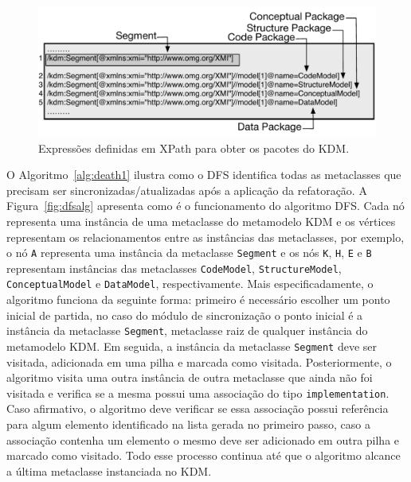 \begin{figure}[h]
	\centering
	\caption{Expressões definidas em XPath para obter os pacotes do KDM.}
	\label{fig:xpath_queries}
	\includegraphics[scale=0.68]{images/queiresANDATLSBESNew}
	\fautor
\end{figure}

O Algoritmo~\ref{alg:death1} ilustra como o DFS identifica todas as metaclasses que precisam ser sincronizadas/atualizadas após a aplicação da refatoração. A Figura~\ref{fig:dfsalg} apresenta como é o funcionamento do algoritmo DFS. Cada nó representa uma instância de uma metaclasse do metamodelo KDM e os vértices representam os relacionamentos entre as instâncias das metaclasses, por exemplo, o nó \texttt{A} representa uma instância da metaclasse \texttt{Segment} e os nós \texttt{K}, \texttt{H}, \texttt{E} e \texttt{B} representam instâncias das metaclasses \texttt{CodeModel}, \texttt{StructureModel}, \texttt{ConceptualModel} e \texttt{DataModel}, respectivamente. Mais especificadamente, o algoritmo funciona da seguinte forma: primeiro é necessário escolher um ponto inicial de partida, no caso do módulo de sincronização o ponto inicial é a instância da metaclasse \texttt{Segment}, metaclasse raiz de qualquer instância do metamodelo KDM. Em seguida, a instância da metaclasse \texttt{Segment} deve ser visitada, adicionada em uma pilha e marcada como visitada. Posteriormente, o algoritmo visita uma outra instância de outra metaclasse que ainda não foi visitada e verifica se a mesma possui uma associação do tipo \texttt{implementation}. Caso afirmativo, o algoritmo deve verificar se essa associação possui referência para algum elemento identificado na lista gerada no primeiro passo, caso a associação contenha um elemento o mesmo deve ser adicionado em outra pilha e marcado como visitado. Todo esse processo continua até que o algoritmo alcance a última metaclasse instanciada no KDM. 

